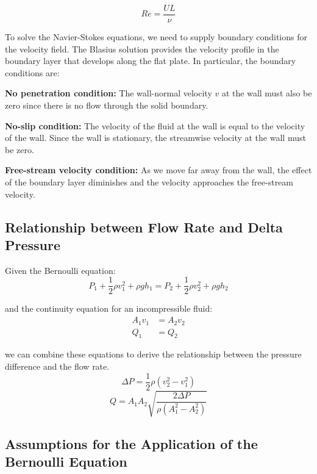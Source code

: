 \documentclass{article}
\begin{document}
\[
Re = \frac{UL}{\nu}
\]

To solve the Navier-Stokes equations, we need to supply boundary conditions for the velocity field. The Blasius solution provides the velocity profile in the boundary layer that develops along the flat plate. In particular, the boundary conditions are:

\textbf{No penetration condition:} The wall-normal velocity $v$ at the wall must also be zero since there is no flow through the solid boundary.

\textbf{No-slip condition:} The velocity of the fluid at the wall is equal to the velocity of the wall. Since the wall is stationary, the streamwise velocity at the wall must be zero.

\textbf{Free-stream velocity condition:} As we move far away from the wall, the effect of the boundary layer diminishes and the velocity approaches the free-stream velocity.







\subsection{Relationship between Flow Rate and Delta Pressure}
Given the Bernoulli equation:
\begin{equation}
P_1 + \frac{1}{2} \rho v_1^2 + \rho gh_1 = P_2 + \frac{1}{2} \rho v_2^2 + \rho gh_2
\end{equation}

and the continuity equation for an incompressible fluid:
\begin{align}
    A_1 v_1 &= A_2 v_2 \\
    Q_1 &= Q_2
\end{align}

we can combine these equations to derive the relationship between the pressure difference and the flow rate.
\begin{equation}
\Delta P = \frac{1}{2} \rho \left( v_2^2 - v_1^2 \right)
\end{equation}
\begin{equation}
Q = A_1 A_2\sqrt{\frac{2 \Delta P}{\rho \left( A_1^2 - A_2^2 \right)}}
\end{equation}

\subsection{Assumptions for the Application of the Bernoulli Equation}
\end{document}
